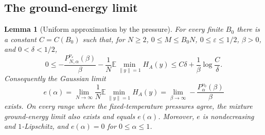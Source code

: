 \documentclass[11pt,a4paper]{article}
\numberwithin{equation}{section}
\newtheorem{lemma}[theorem]{Lemma}
\theoremstyle{definition}
\theoremstyle{remark}
\newcommand{\E}{\mathbb E}
\newcommand{\eps}{\varepsilon}
\begin{document}
\subsection{The ground-energy limit}

\begin{lemma}[Uniform approximation by the pressure]
\label{thresh:pressure-energy}
For every finite $B_0$ there is a constant $C=C(B_0)$ such that, for
$N\geq2$, $0\leq M\leq B_0N$, $0\leq\eps\leq1/2$, $\beta>0$, and
$0<\delta<1/2$,
\begin{equation}
 0\leq -\frac{P_{N,\alpha}^{\nu_\eps}(\beta)}{\beta}
       -\frac1N\E\min_{\|y\|=1}H_A(y)
 \leq C\delta+\frac1\beta\log\frac C\delta.
 \label{thresh:eq:pressure-energy}
\end{equation}
Consequently the Gaussian limit
\[
 e(\alpha)=\lim_{N\to\infty}\frac1N\E\min_{\|y\|=1}H_A(y)
          =\lim_{\beta\to\infty}
                    -\frac{P_{\alpha}^{\nu_0}(\beta)}{\beta}
\]
exists.  On every range where the fixed-temperature pressures agree,
the mixture ground-energy limit also exists and equals $e(\alpha)$.
Moreover, $e$ is nondecreasing and $1$-Lipschitz, and $e(\alpha)=0$ for
$0\leq\alpha\leq1$.
\end{lemma}
\end{document}
